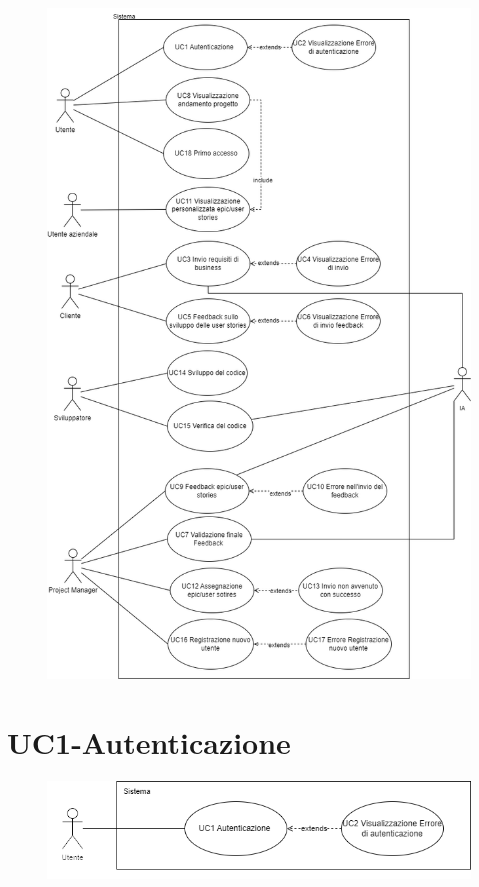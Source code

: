 \documentclass{article}
\begin{document}
\newpage
\begin{figure}[h]
    \centering
    \includegraphics[height = 0.75\textheight]{./imgUML/UML.png}
    \label{fig:immagine}
\end{figure}
\newpage

\section{UC1-Autenticazione}
    \begin{figure}[h]
      \centering
      \includegraphics{./imgUML/UC1.png}
      \label{fig:immagine}
    \end{figure} 
    
\end{document}
